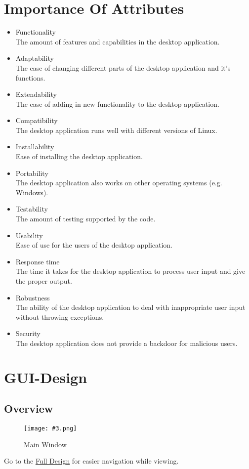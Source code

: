 \documentclass[10pt,a4paper]{report}
\newcommand{\attribute}[2]{
    #1 \leavevmode \\ #2
}
\newcommand{\h}[1]{\textcolor{col:highlight}{#1}}
\newcommand{\includeimage}[5]{
    \begin{figure}[H]
        #1
        \texttt{[image: \#3.png]}
        \caption{#4}
        \label{fig:#5}
    \end{figure}
}
\begin{document}
\chapter{Importance Of Attributes}

\begin{itemize}
    \renewcommand\labelitemi{++}
    \item \attribute{Functionality}{The amount of features and capabilities in the desktop application.}
    \item \attribute{Adaptability}{The ease of changing different parts of the desktop application and it's functions.}
    \item \attribute{Extendability}{The ease of adding in new functionality to the desktop application.}
    \renewcommand\labelitemi{+}
    \item \attribute{Compatibility}{The desktop application runs well with different versions of Linux.}
    \item \attribute{Installability}{Ease of installing the desktop application.}
    \item \attribute{Portability}{The desktop application also works on other operating systems (e.g. Windows).}
    \item \attribute{Testability}{The amount of testing supported by the code.}
    \item \attribute{Usability}{Ease of use for the users of the desktop application.}
    \item \attribute{Response time}{The time it takes for the desktop application to process user input and give the proper output.}
    \renewcommand\labelitemi{o}
    \item \attribute{Robustness}{The ability of the desktop application to deal with inappropriate user input without throwing exceptions.}
    \renewcommand\labelitemi{-}
    \item \attribute{Security}{The desktop application does not provide a backdoor for malicious users.}
\end{itemize}

\chapter{GUI-Design}
\section{Overview}
\includeimage{}{0.25}{Main Window}{Main Window}{main_window}
Go to the \href{https://www.figma.com/file/GP708HBs3aSgKMK5QeQZb5/GELF?node-id=0\%3A1}{\h{Full Design}} for easier navigation while viewing.
\end{document}
